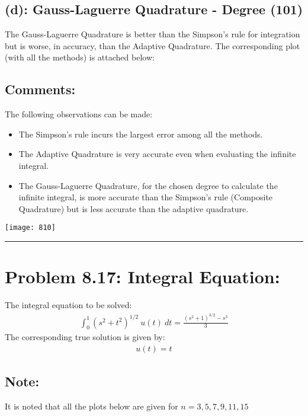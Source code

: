 \subsection*{(d): Gauss-Laguerre Quadrature - Degree (101) }
The Gauss-Laguerre Quadrature is better than the Simpson's rule for integration but is worse, in accuracy, than the Adaptive Quadrature. The corresponding plot (with all the methods) is attached below: 
\subsection*{Comments: }
The following observations can be made: 
\begin{itemize}
\item The Simpson's rule incurs the largest error among all the methods. 
\item The Adaptive Quadrature is very accurate even when evaluating the infinite integral. 
\item The Gauss-Laguerre Quadrature, for the chosen degree to calculate the infinite integral, is more accurate than the Simpson's rule (Composite Quadrature) but is less accurate than the adaptive quadrature.
\end{itemize}
\begin{center}
\texttt{[image: 810]}
\end{center}\hrule
\newpage\section*{Problem 8.17: Integral Equation: }
The integral equation to be solved: 
\begin{align*}
\int_{0}^1
{\left( 
s^2+t^2
\right)}^{1/2}\ u(t)\ dt = \frac{{\left( s^2+1\right)}^{3/2}-s^3}{3}
\end{align*}
The corresponding true solution is given by: 
\begin{align*}
u(t) = t
\end{align*}
\subsection*{Note: }
It is noted that all the plots below are given for $n=3,5,7,9,11,15$
